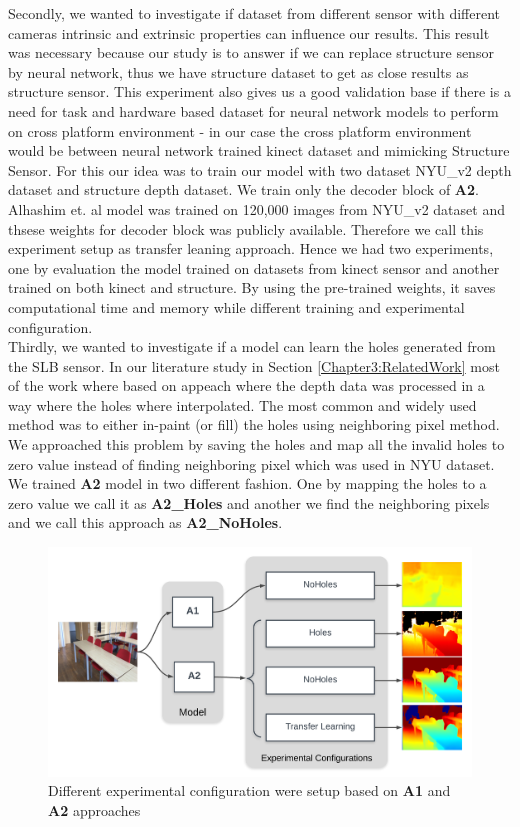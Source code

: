 Secondly, we wanted to investigate if dataset from different sensor with different cameras intrinsic and extrinsic properties can influence our results.  This result was necessary because our study is to answer if we can replace structure sensor by neural network, thus we have structure dataset to get as close results as structure sensor. This experiment also gives us a good validation base if there is a need for task and hardware based dataset for neural network models to perform on cross platform environment - in our case  the cross platform environment would be between neural network trained kinect dataset and mimicking Structure Sensor. For this our idea was to train our model with two dataset NYU\_v2 depth dataset and structure depth dataset. We train only the decoder block of \textbf{A2}. Alhashim et. al \cite{Alhashim2018} model was trained on 120,000 images from NYU\_v2 dataset and thsese weights for decoder block was publicly available. Therefore we call this experiment setup as transfer leaning approach. Hence we had two experiments, one by evaluation the model trained on  datasets from kinect sensor and another trained on both kinect and structure. By using the pre-trained weights, it saves computational time and memory while different training and experimental configuration. \\

Thirdly, we wanted to investigate if a model can learn the holes generated from the SLB sensor. In our literature study in Section \ref{Chapter3:RelatedWork} most of the work where based on appeach where the depth data was processed  in a way where the holes where interpolated. The most common and widely used method was to either in-paint (or fill) the holes using neighboring pixel \cite{silberman11indoor} method. We approached this problem by saving the holes and map all the invalid holes to zero value instead of finding neighboring pixel which was used in NYU dataset. We trained \textbf{A2} model in two different fashion. One by mapping the holes to a zero value we call it as \textbf{A2\_Holes} and another we find the neighboring pixels and we call this approach as \textbf{A2\_NoHoles}.

\begin{figure}[h]
    \centering
    \includegraphics[width = 15cm]{Figures/config_setup.png}
    \caption{Different experimental configuration were setup based on \textbf{A1} and \textbf{A2} approaches}
    \label{fig:Experimental_Setup}
\end{figure}{}



